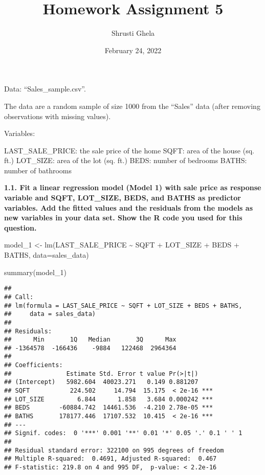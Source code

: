 \documentclass[
]{article}
\title{Homework Assignment 5}
\author{Shrusti Ghela}
\date{February 24, 2022}
\newenvironment{Shaded}{\begin{snugshade}}{\end{snugshade}}
\newcommand{\AttributeTok}[1]{\textcolor[rgb]{0.77,0.63,0.00}{#1}}
\newcommand{\FunctionTok}[1]{\textcolor[rgb]{0.00,0.00,0.00}{#1}}
\newcommand{\NormalTok}[1]{#1}
\newcommand{\OtherTok}[1]{\textcolor[rgb]{0.56,0.35,0.01}{#1}}
\newcommand{\SpecialCharTok}[1]{\textcolor[rgb]{0.00,0.00,0.00}{#1}}
\begin{document}
\maketitle

Data: ``Sales\_sample.csv''.

The data are a random sample of size 1000 from the ``Sales'' data (after
removing observations with missing values).

Variables:

LAST\_SALE\_PRICE: the sale price of the home SQFT: area of the house
(sq. ft.) LOT\_SIZE: area of the lot (sq. ft.) BEDS: number of bedrooms
BATHS: number of bathrooms

\textbf{1.1. Fit a linear regression model (Model 1) with sale price as
response variable and SQFT, LOT\_SIZE, BEDS, and BATHS as predictor
variables. Add the fitted values and the residuals from the models as
new variables in your data set. Show the R code you used for this
question.}

\begin{Shaded}
\begin{Highlighting}[]
\NormalTok{model\_1 }\OtherTok{\textless{}{-}} \FunctionTok{lm}\NormalTok{(LAST\_SALE\_PRICE }\SpecialCharTok{\textasciitilde{}}\NormalTok{ SQFT }\SpecialCharTok{+}\NormalTok{ LOT\_SIZE }\SpecialCharTok{+}\NormalTok{ BEDS }\SpecialCharTok{+}\NormalTok{ BATHS, }\AttributeTok{data=}\NormalTok{sales\_data)}

\FunctionTok{summary}\NormalTok{(model\_1)}
\end{Highlighting}
\end{Shaded}

\begin{verbatim}
## 
## Call:
## lm(formula = LAST_SALE_PRICE ~ SQFT + LOT_SIZE + BEDS + BATHS, 
##     data = sales_data)
## 
## Residuals:
##      Min       1Q   Median       3Q      Max 
## -1364578  -166436    -9884   122468  2964364 
## 
## Coefficients:
##               Estimate Std. Error t value Pr(>|t|)    
## (Intercept)   5982.604  40023.271   0.149 0.881207    
## SQFT           224.502     14.794  15.175  < 2e-16 ***
## LOT_SIZE         6.844      1.858   3.684 0.000242 ***
## BEDS        -60884.742  14461.536  -4.210 2.78e-05 ***
## BATHS       178177.446  17107.532  10.415  < 2e-16 ***
## ---
## Signif. codes:  0 '***' 0.001 '**' 0.01 '*' 0.05 '.' 0.1 ' ' 1
## 
## Residual standard error: 322100 on 995 degrees of freedom
## Multiple R-squared:  0.4691, Adjusted R-squared:  0.467 
## F-statistic: 219.8 on 4 and 995 DF,  p-value: < 2.2e-16
\end{verbatim}
\end{document}
